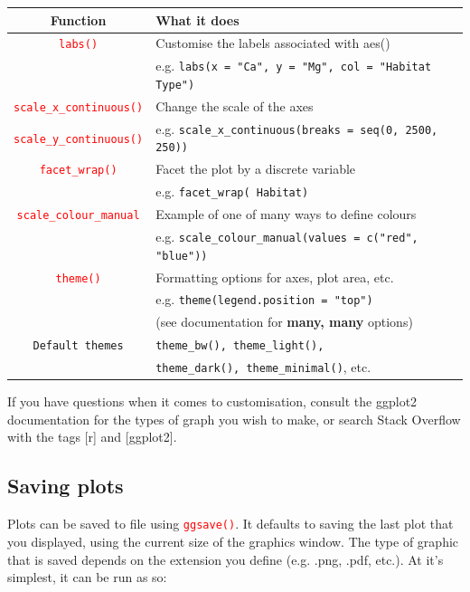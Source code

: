 \documentclass[a4paper,12pt]{article}
\newcommand\code[1]{\textcolor{red}{\texttt{#1}}}
\begin{document}
\begin{table}[h]
	\centering
	\begin{tabular}{cl}
		
		Function & What it does \\ \hline
		\code{labs()} & Customise the labels associated with aes() \\
		              & e.g. \texttt{labs(x = "Ca", y = "Mg", col = "Habitat Type")} \\ \hline
		\code{scale\_x\_continuous()} & Change the scale of the axes \\
		\code{scale\_y\_continuous()} & e.g. \texttt{scale\_x\_continuous(breaks = seq(0, 2500, 250))} \\ \hline
		\code{facet\_wrap()} & Facet the plot by a discrete variable \\
		                  & e.g. \texttt{facet\_wrap(~Habitat)} \\  \hline
		\code{scale\_colour\_manual} & Example of one of many ways to define colours \\
		                           & e.g. \texttt{scale\_colour\_manual(values = c("red", "blue"))} \\ \hline
		\code{theme()} & Formatting options for axes, plot area, etc. \\
		               & e.g. \texttt{theme(legend.position = "top")} \\
		               & (see documentation for \textbf{many, many} options) \\ \hline
		\texttt{Default themes} & \texttt{theme\_bw(), theme\_light(),} \\
		                        & \texttt{theme\_dark(), theme\_minimal()}, etc. \\
		\hline
		
	\end{tabular}
	 
	\label{tbl:ggplot_customisations}
\end{table}


If you have questions when it comes to customisation, consult the ggplot2 documentation for the types of graph you wish to make, or search Stack Overflow with the tags [r] and [ggplot2].

\subsection{Saving plots}

Plots can be saved to file using \code{ggsave()}. It defaults to saving the last plot that you displayed, using the current size of the graphics window. The type of graphic that is saved depends on the extension you define (e.g. .png, .pdf, etc.). At it's simplest, it can be run as so:
\end{document}

